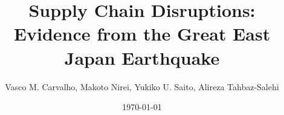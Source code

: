 \documentclass{beamer}
\title{Supply Chain Disruptions: Evidence from the Great East Japan Earthquake}
\author{Vasco M. Carvalho, 
Makoto Nirei, 
Yukiko U. Saito, 
Alireza Tahbaz-Salehi}
\date{\today}
\begin{document}
{
\begin{frame}
\titlepage
\end{frame}
}
\end{document}
